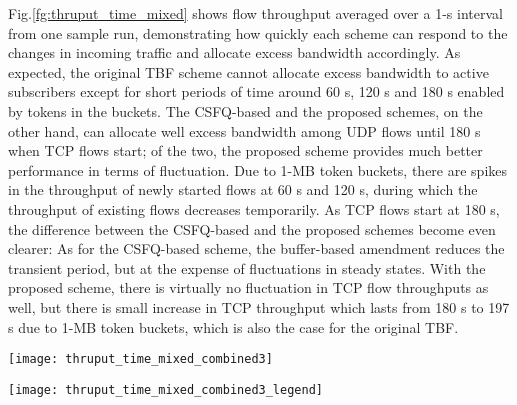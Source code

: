 \documentclass[conference,twoside,final]{IEEEtran}
\begin{document}
Fig.\ref{fg:thruput_time_mixed} shows flow throughput averaged over a 1-s
interval from one sample run, demonstrating
how quickly each scheme can respond to the changes in incoming traffic and
allocate excess bandwidth accordingly. As expected, the original TBF scheme
cannot allocate excess bandwidth to active subscribers except for short periods
of time around 60 s, 120 s and 180 s enabled by tokens in the buckets. The
CSFQ-based and the proposed schemes, on the other hand, can allocate well excess
bandwidth among UDP flows until 180 s when TCP flows start; of the two, the
proposed scheme provides much better performance in terms of fluctuation. Due to
1-MB token buckets, there are spikes in the throughput of newly started flows at
60 s and 120 s, during which the throughput of existing flows decreases
temporarily. As TCP flows start at 180 s, the difference between the CSFQ-based
and the proposed schemes become even clearer: As for the CSFQ-based scheme, the
buffer-based amendment reduces the transient period, but at the expense of
fluctuations in steady states. With the proposed scheme, there is virtually no
fluctuation in TCP flow throughputs as well, but there is small increase in TCP
throughput which lasts from 180 s to 197 s due to 1-MB token buckets, which is
also the case for the original TBF.
\begin{figure*}[!htb]
    \hspace{0.04\linewidth}
    \begin{minipage}[c]{.85\linewidth}
        \begin{center}
            \texttt{[image: thruput\_time\_mixed\_combined3]}
        \end{center}
    \end{minipage}
    \begin{minipage}{.07\linewidth}
        \begin{center}
            \vspace{0.17\linewidth}
            \texttt{[image: thruput\_time\_mixed\_combined3\_legend]}
        \end{center}
    \end{minipage}
    \caption{Time series of throughput of flows for ISP traffic control schemes with mixed traffic.}
    \label{fg:thruput_time_mixed}
\end{figure*}
\end{document}
